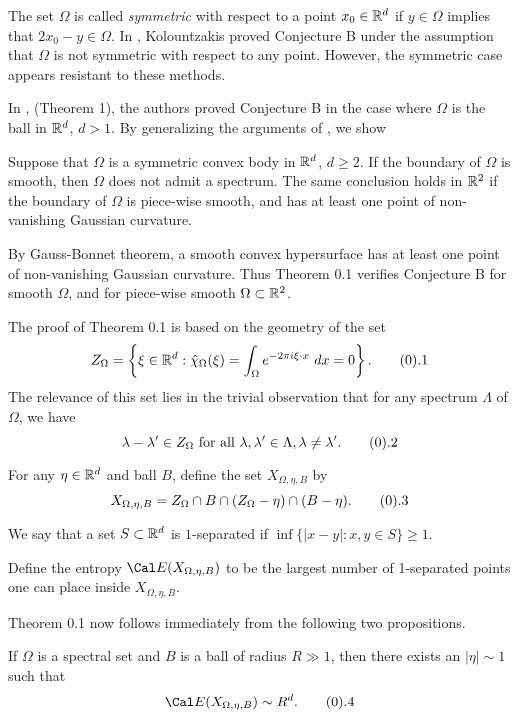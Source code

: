 The set $\Omega$ is called {\it symmetric} with respect to a point
$x_0 \in {\Bbb R}^d$ if $y \in \Omega$ implies that $2x_0-y \in \Omega$.
In \cite{Kol}, Kolountzakis proved Conjecture B under the assumption that
$\Omega$ is not symmetric with respect to any point.  However, the symmetric 
case appears resistant to these methods.

In \cite{IKP}, (Theorem 1), the authors proved Conjecture B in the case
where $\Omega$ is the ball in ${\Bbb R}^d$, $d>1$. By generalizing the
arguments of \cite{IKP}, we show

 Suppose that $\Omega$ is a symmetric convex body in ${\Bbb R}^d$, 
$d \ge 2$. If the boundary of $\Omega$ is smooth, then $\Omega$ does not admit a spectrum.
The same conclusion holds in ${\Bbb R}^2$ if the boundary of $\Omega$ is piece-wise smooth, 
and has at least one point of non-vanishing Gaussian curvature. \endproclaim  

By Gauss-Bonnet theorem, a smooth convex hypersurface has at least one point of non-vanishing Gaussian 
curvature. Thus Theorem 0.1 verifies Conjecture B for smooth $\Omega$, and for piece-wise smooth 
$\Omega \subset {\Bbb R}^2$. 

The proof of Theorem 0.1 is based on the geometry of the set
$$Z_{\Omega}= \left\{\xi \in \Bbb R^d: \hat \chi_{\Omega}(\xi)=\int_\Omega
e^{-2\pi i \xi \cdot x}\ dx=0 \right\}. \tag0.1$$
The relevance of this set lies in the trivial observation that for any
spectrum $\Lambda$ of $\Omega$, we have
$$ \lambda - \lambda' \in Z_\Omega \hbox{ for all } \lambda, \lambda' \in
\Lambda, \lambda \neq \lambda'.  \tag0.2$$

For any $\eta \in {\Bbb R^d}$ and ball $B$, define the set
$X_{\Omega,\eta,B}$ by
$$ X_{\Omega,\eta,B} = Z_\Omega \cap B \cap (Z_\Omega - \eta) \cap (B -
\eta). \tag0.3$$

 We say that a set $S \subset {\Bbb R}^d$ is 
$1$-separated if $\inf \{|x-y|: x,y \in S\} \ge 1$. \enddefinition

Define the entropy $\E(X_{\Omega,\eta,B})$ to be the largest number of
1-separated points one can place inside $X_{\Omega,\eta,B}$.

Theorem 0.1 now follows immediately from the following two propositions.

 If $\Omega$ is a spectral set and $B$ is a ball
of radius $R \gg 1$, then there exists an $|\eta| \sim 1$ such that
$$ \E(X_{\Omega,\eta,B}) \sim R^d. \tag0.4$$
\endproclaim

